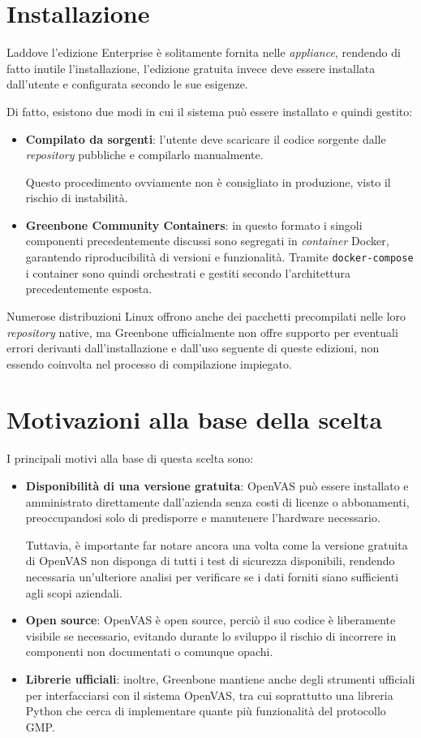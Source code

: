 \section{Installazione}
Laddove l'edizione Enterprise è solitamente fornita nelle \emph{appliance}, rendendo di fatto inutile l'installazione, l'edizione gratuita invece deve essere installata dall'utente e configurata secondo le sue esigenze.

Di fatto, esistono due modi in cui il sistema può essere installato e quindi gestito:
\begin{itemize}
    \item \textbf{Compilato da sorgenti}: l'utente deve scaricare il codice sorgente dalle \emph{repository} pubbliche e compilarlo manualmente.
    
    Questo procedimento ovviamente non è consigliato in produzione, visto il rischio di instabilità.
    \item \textbf{Greenbone Community Containers}: in questo formato i singoli componenti precedentemente discussi sono segregati in \emph{container} Docker, garantendo riproducibilità di versioni e funzionalità. Tramite \texttt{docker-compose} i container sono quindi orchestrati e gestiti secondo l'architettura precedentemente esposta.
\end{itemize}

Numerose distribuzioni Linux offrono anche dei pacchetti precompilati nelle loro \emph{repository} native, ma Greenbone ufficialmente non offre supporto per eventuali errori derivanti dall'installazione e dall'uso seguente di queste edizioni, non essendo coinvolta nel processo di compilazione impiegato.

\section{Motivazioni alla base della scelta}
I principali motivi alla base di questa scelta sono:
\begin{itemize}
    \item \textbf{Disponibilità di una versione gratuita}: OpenVAS può essere installato e amministrato direttamente dall'azienda senza costi di licenze o abbonamenti, preoccupandosi solo di predisporre e manutenere l'hardware necessario.
    
    Tuttavia, è importante far notare ancora una volta come la versione gratuita di OpenVAS non disponga di tutti i test di sicurezza disponibili, rendendo necessaria un'ulteriore analisi per verificare se i dati forniti siano sufficienti agli scopi aziendali.

    \item \textbf{Open source}: OpenVAS è open source, perciò il suo codice è liberamente visibile se necessario, evitando durante lo sviluppo il rischio di incorrere in componenti non documentati o comunque opachi.
    
    \item \textbf{Librerie ufficiali}: inoltre, Greenbone mantiene anche degli strumenti ufficiali per interfacciarsi con il sistema OpenVAS, tra cui soprattutto una libreria Python che cerca di implementare quante più funzionalità del protocollo GMP.
\end{itemize}